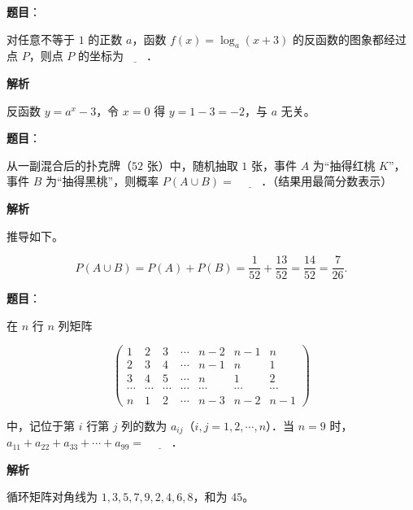 \begin{answer}

\textbf{题目}：

对任意不等于 $1$ 的正数 $a$，函数 $f(x)=\log_a(x+3)$ 的反函数的图象都经过点 $P$，则点 $P$ 的坐标为$\underline{\qquad}$．

\textbf{解析}

反函数 $y=a^x-3$，令 $x=0$ 得 $y=1-3=-2$，与 $a$ 无关。


\end{answer}
\begin{answer}

\textbf{题目}：

从一副混合后的扑克牌（$52$ 张）中，随机抽取 $1$ 张，事件 $A$ 为“抽得红桃 $K$”，事件 $B$ 为“抽得黑桃”，则概率 $P(A\cup B)=$ $\underline{\qquad}$．（结果用最简分数表示）

\textbf{解析}

推导如下。

\nopagebreak[4]
\[P(A\cup B)=P(A)+P(B)=\frac1{52}+\frac{13}{52}=\frac{14}{52}=\frac7{26}.\]


\end{answer}
\begin{answer}

\textbf{题目}：

在 $n$ 行 $n$ 列矩阵

\nopagebreak[4]
\[\begin{pmatrix}
1&2&3&\cdots&n-2&n-1&n\\
2&3&4&\cdots&n-1&n&1\\
3&4&5&\cdots&n&1&2\\
\cdots&\cdots&\cdots&\cdots&\cdots&\cdots&\cdots\\
n&1&2&\cdots&n-3&n-2&n-1
\end{pmatrix}\]

中，记位于第 $i$ 行第 $j$ 列的数为 $a_{ij}$（$i,j=1,2,\cdots,n$）．当 $n=9$ 时，$a_{11}+a_{22}+a_{33}+\cdots+a_{99}=$ $\underline{\qquad}$．

\textbf{解析}

循环矩阵对角线为 $1,3,5,7,9,2,4,6,8$，和为 $45$。


\end{answer}
